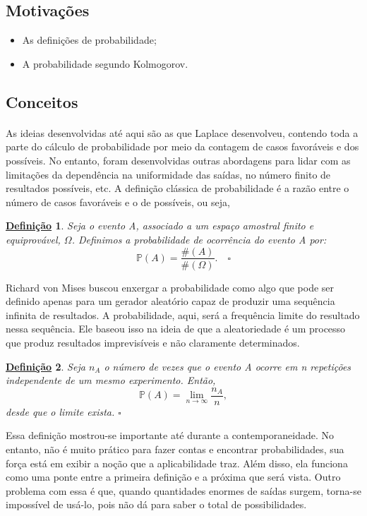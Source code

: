 \documentclass{article}
\newtheorem*{def*}{\underline{Defini\c c\~ao}}
\begin{document}
\subsection{Motivações}
\begin{itemize}
  \item As definições de probabilidade;
  \item A probabilidade segundo Kolmogorov.
\end{itemize}
\subsection{Conceitos}
\paragraph{}As ideias desenvolvidas até aqui são as que Laplace desenvolveu, contendo toda a parte do cálculo
de probabilidade por meio da contagem de casos favoráveis e dos possíveis. No entanto, foram desenvolvidas outras
abordagens para lidar com as limitações da dependência na uniformidade das saídas, no número finito de resultados possíveis, etc.
A definição clássica de probabilidade é a razão entre o número de casos favoráveis e o de possíveis, ou seja, 
\begin{def*}
  Seja o evento A, associado a um espaço amostral finito e equiprovável, \(\Omega \). Definimos a probabilidade de ocorrência do evento A por: 
  \[
    \mathbb{P}(A) = \frac{\#(A)}{\#(\Omega )}.\quad \square
  \]
\end{def*}
Richard von Mises buscou enxergar a probabilidade como algo que pode ser definido apenas para um gerador aleatório capaz de produzir uma sequência infinita de resultados.
A probabilidade, aqui, será a frequência limite do resultado nessa sequência. Ele baseou isso na ideia de que a aleatoriedade é um processo que produz resultados imprevisíveis
e não claramente determinados.
\begin{def*}
  Seja \(n_{A}\) o número de vezes que o evento A ocorre em n repetições independente de um mesmo experimento. Então, 
  \[
    \mathbb{P}(A) = \lim_{n\to \infty}\frac{n_{A}}{n},
  \]
  desde que o limite exista. \(\square\)
\end{def*}
Essa definição mostrou-se importante até durante a contemporaneidade. No entanto, não é muito prático para fazer contas e encontrar probabilidades, 
sua força está em exibir a noção que a aplicabilidade traz. Além disso, ela funciona como uma ponte entre a primeira definição e a próxima que será vista.
Outro problema com essa é que, quando quantidades enormes de saídas surgem, torna-se impossível de usá-lo, pois não dá para saber o total de possibilidades.
\end{document}
